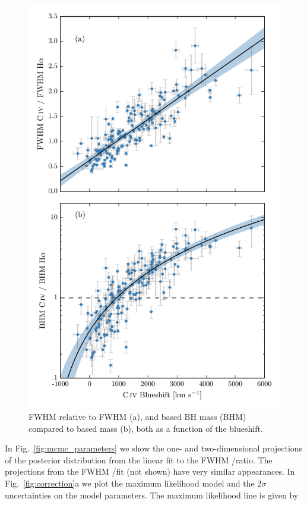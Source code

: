 \begin{figure}
    \includegraphics[width=\textwidth]{figures/chapter03/fwhm_and_bhm_ha.pdf} 
    \caption{ FWHM relative to \hb FWHM (a), and  based BH mass (BHM) compared to \hb based mass (b), both as a function of the  blueshift.}  
    \label{fig:correction_hb}
\end{figure}

In Fig.~\ref{fig:mcmc_parameters} we show the one- and two-dimensional projections of the posterior distribution from the linear fit to the FWHM /\ha ratio. 
The projections from the FWHM /\hb fit (not shown) have very similar appearances.
In Fig.~\ref{fig:correction}a we plot the maximum likelihood model and the 2$\sigma$ uncertainties on the model parameters. 
The maximum likelihood line is given by  

